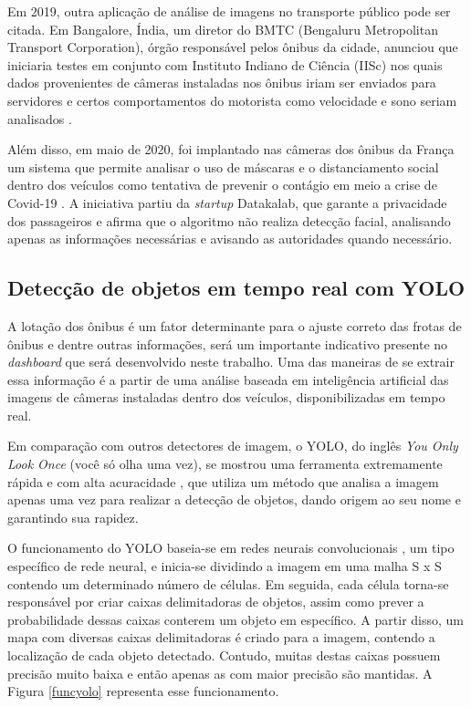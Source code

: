 \par Em 2019, outra aplicação de análise de imagens no transporte público pode ser citada. Em Bangalore, Índia,  um diretor do BMTC (Bengaluru Metropolitan Transport Corporation), órgão responsável pelos ônibus da cidade, anunciou que iniciaria testes em conjunto com Instituto Indiano de Ciência (IISc) nos quais dados provenientes de câmeras instaladas nos ônibus iriam ser enviados para servidores e certos comportamentos do motorista como velocidade e sono seriam analisados \cite{Prasad2019}.

\par Além disso, em maio de 2020, foi implantado nas câmeras dos ônibus da França um sistema que permite analisar o uso de máscaras e o distanciamento social dentro dos veículos como tentativa de prevenir o contágio em meio a crise de Covid-19 \cite{BBC2020}. A iniciativa partiu da \textit{startup} Datakalab, que garante a privacidade dos passageiros e afirma que o algoritmo não realiza detecção facial, analisando apenas as informações necessárias e avisando as autoridades quando necessário.

\subsection{Detecção de objetos em tempo real com YOLO}

\indent
\par A lotação dos ônibus é um fator determinante para o ajuste correto das frotas de ônibus e dentre outras informações, será um importante indicativo presente no \textit{dashboard} que será desenvolvido neste trabalho. Uma das maneiras de se extrair essa informação é a partir de uma análise baseada em inteligência artificial das imagens de câmeras instaladas dentro dos veículos, disponibilizadas em tempo real.

\par Em comparação com outros detectores de imagem, o YOLO, do inglês \textit{You Only Look Once} (você só olha uma vez), se mostrou uma ferramenta extremamente rápida e com alta acuracidade \cite{RedmonJosephandFarhadi2018}, que utiliza um método que analisa a imagem apenas uma vez para realizar a detecção de objetos, dando origem ao seu nome e garantindo sua rapidez.

\par O funcionamento do YOLO baseia-se em redes neurais convolucionais \cite{RedmonJosephandFarhadi2018}, um tipo específico de rede neural, e inicia-se dividindo a imagem em uma malha S x S contendo um determinado número de células. Em seguida, cada célula torna-se responsável por criar caixas delimitadoras de objetos, assim como prever a probabilidade dessas caixas conterem um objeto em específico. A partir disso, um mapa com diversas caixas delimitadoras é criado para a imagem, contendo a localização de cada objeto detectado. Contudo, muitas destas caixas possuem precisão muito baixa e então apenas as com maior precisão são mantidas. A Figura \ref{funcyolo} representa esse funcionamento.

